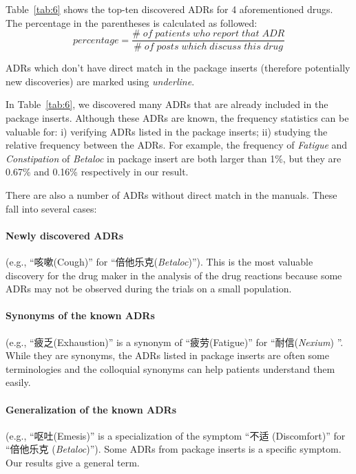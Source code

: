 Table~\ref{tab:6} shows the top-ten discovered ADRs for 4 aforementioned drugs. The percentage in the parentheses is calculated as followed:
\begin{equation}
	percentage = \frac{\#\;of\;patients\;who\;report\;that\;ADR}{\#\;of\;posts\;which\;discuss\;this\;drug}
\end{equation}

ADRs which don’t have direct match in the package inserts (therefore potentially new discoveries) are marked using {\em underline}.

In Table~\ref{tab:6}, we discovered many ADRs that are already included in the package inserts. Although these ADRs are known, the frequency statistics can be valuable for: i) verifying ADRs listed in the package inserts; ii) studying the relative frequency between the ADRs. For example, the frequency of \textit{Fatigue} and \textit{Constipation} of \textit{Betaloc} in package insert are both larger than 1\%, but they are 0.67\% and 0.16\% respectively in our result.

There are also a number of ADRs without direct match in the manuals. These fall into several cases:
\paragraph{Newly discovered ADRs} (e.g., “咳嗽(Cough)” for “倍他乐克(\textit{Betaloc})”). This is the most valuable discovery for the drug maker in the analysis of the drug reactions because some ADRs may not be observed during the trials 
on a small population. 
\paragraph{Synonyms of the known ADRs} (e.g., “疲乏(Exhaustion)” is a synonym of “疲劳(Fatigue)” for “耐信(\textit{Nexium}) ”.  While they are synonyms, the ADRs listed in package inserts are often some terminologies and the colloquial synonyms can help patients understand them easily.
\paragraph{Generalization of the known ADRs} (e.g., “呕吐(Emesis)” is a specialization of the symptom “不适 (Discomfort)” for “倍他乐克 (\textit{Betaloc})”). Some ADRs from package inserts is a specific symptom. Our results give a general term.

